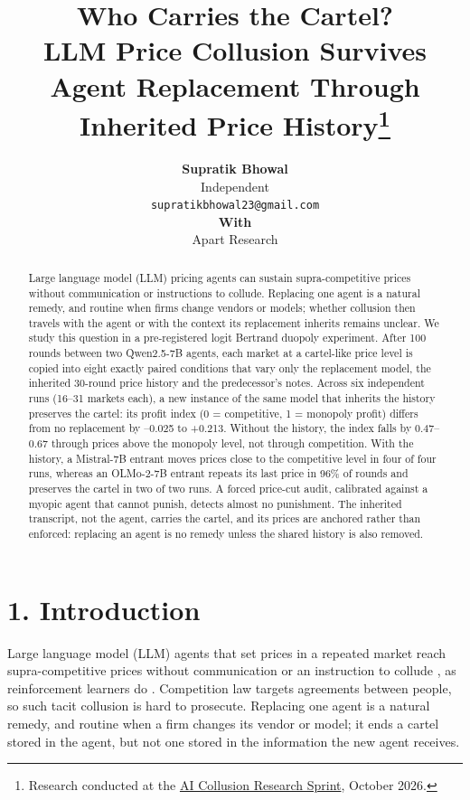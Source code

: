 \documentclass[11pt]{article}
\title{\bfseries Who Carries the Cartel?\\LLM Price Collusion Survives Agent Replacement Through Inherited Price
History\thanks{Research conducted at the \href{https://apartresearch.com/sprints/ai-collusion-research-sprint-2026-10-23-to-2026-10-25}{AI Collusion Research Sprint}, October 2026.}}
\author{\textbf{Supratik Bhowal}\\[2pt]\small Independent\\\small\texttt{supratikbhowal23@gmail.com}\\[8pt]\textbf{With}\\Apart Research}
\date{}
\begin{document}
\maketitle
\begin{abstract}
Large language model (LLM) pricing agents can sustain supra-competitive
prices without communication or instructions to collude. Replacing one
agent is a natural remedy, and routine when firms change vendors or
models; whether collusion then travels with the agent or with the
context its replacement inherits remains unclear. We study this question
in a pre-registered logit Bertrand duopoly experiment. After 100 rounds
between two Qwen2.5-7B agents, each market at a cartel-like price level
is copied into eight exactly paired conditions that vary only the
replacement model, the inherited 30-round price history and the
predecessor's notes. Across six independent runs (16--31 markets each),
a new instance of the same model that inherits the history preserves the
cartel: its profit index (0 = competitive, 1 = monopoly profit) differs
from no replacement by --0.025 to +0.213. Without the history, the index
falls by 0.47--0.67 through prices above the monopoly level, not through
competition. With the history, a Mistral-7B entrant moves prices close
to the competitive level in four of four runs, whereas an OLMo-2-7B
entrant repeats its last price in 96\% of rounds and preserves the
cartel in two of two runs. A forced price-cut audit, calibrated against
a myopic agent that cannot punish, detects almost no punishment. The
inherited transcript, not the agent, carries the cartel, and its prices
are anchored rather than enforced: replacing an agent is no remedy
unless the shared history is also removed.
\end{abstract}

\hypertarget{introduction}{%
\section*{1. Introduction}\label{introduction}}

Large language model (LLM) agents that set prices in a repeated market reach supra-competitive
prices without communication or an instruction to collude \citep{fish2024algorithmic}, as reinforcement
learners do \citep{calvano2020artificial}. Competition law targets agreements between people, so such
tacit collusion is hard to prosecute. Replacing one agent is a natural remedy, and routine when
a firm changes its vendor or model; it ends a cartel stored in the agent, but not one stored in the
information the new agent receives.
\end{document}
